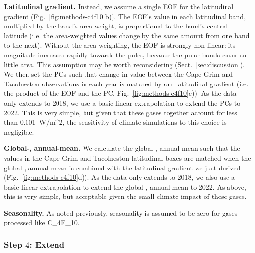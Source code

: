 \textbf{Latitudinal gradient.}
Instead, we assume a single EOF for the latitudinal gradient (Fig.~\ref{fig:methods-c4f10}b)).
The EOF's value in each latitudinal band, multiplied by the band's area weight,
is proportional to the band's central latitude
(i.e. the area-weighted values change by the same amount from one band to the next).
Without the area weighting, the EOF is strongly non-linear:
its magnitude increases rapidly towards the poles, because the polar bands cover so little area.
This assumption may be worth reconsidering (Sect.~\ref{sec:discussion}).
We then set the PCs such that change in value between the
Cape Grim and Tacolneston observations in each year
is matched by our latitudinal gradient (i.e. the product of the EOF and the PC, Fig.~\ref{fig:methods-c4f10}c)).
As the \citet{droste_pfcs_2020} data only extends to 2018,
we use a basic linear extrapolation to extend the PCs to 2022.
This is very simple, but given that these gases together account for less than 0.001~W/m^2,
the sensitivity of climate simulations to this choice is negligible.

\textbf{Global-, annual-mean.}
We calculate the global-, annual-mean such that the values in the
Cape Grim and Tacolneston latitudinal boxes are matched
when the global-, annual-mean is combined with the latitudinal gradient we just derived
(Fig.~\ref{fig:methods-c4f10}d)).
As the \citet{droste_pfcs_2020} data only extends to 2018,
we also use a basic linear extrapolation to extend the global-, annual-mean to 2022.
As above, this is very simple, but acceptable given the small climate impact of these gases.

\textbf{Seasonality.}
As noted previously, seasonality is assumed to be zero for gases processed like C_4F_10.

\subsubsection{Step 4: Extend}
\label{sssec:methods-c4f10-like-extend}

